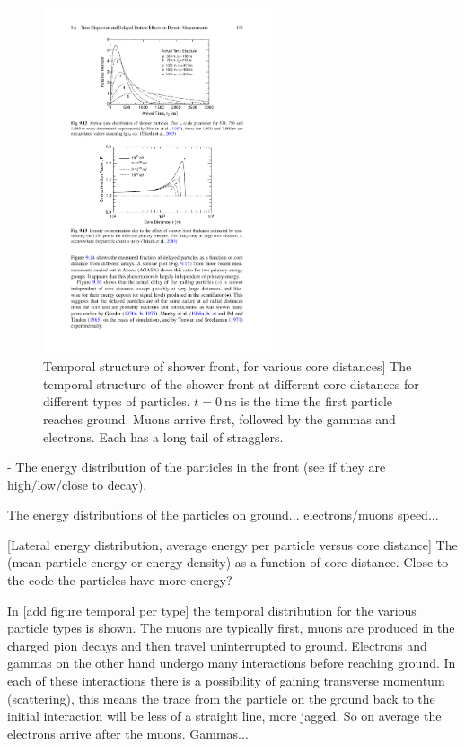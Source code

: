 \begin{figure}
    \centering
    \includegraphics[width=0.6\textwidth]
                    {plots/cosmic-rays/temporal_profile}
    \caption{Temporal structure of shower front, for various core distances]
The temporal structure of the shower front at different core distances for different types of particles. $t = \SI{0}{\ns}$ is the time the first particle reaches ground. Muons arrive first, followed by the gammas and electrons. Each has a long tail of stragglers.}
    \label{fig:temporal_profile}
\end{figure}


- The energy distribution of the particles in the front (see if they are high/low/close to decay).

The energy distributions of the particles on ground... electrons/muons speed...

[Lateral energy distribution, average energy per particle versus core distance]
The (mean particle energy or energy density) as a function of core distance. Close to the code the particles have more energy?

In [add figure temporal per type] the temporal distribution for the various particle types is shown. The muons are typically first, muons are produced in the charged pion decays and then travel uninterrupted to ground. Electrons and gammas on the other hand undergo many interactions before reaching ground. In each of these interactions there is a possibility of gaining transverse momentum (scattering), this means the trace from the particle on the ground back to the initial interaction will be less of a straight line, more jagged. So on average the electrons arrive after the muons. Gammas...


